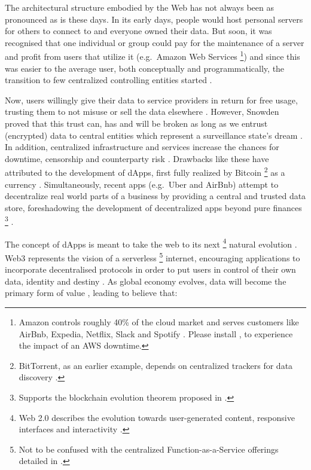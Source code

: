 The architectural structure embodied by the Web has not always been as pronounced as is these days. In its early days, people would host personal servers for others to connect to and everyone owned their data. But soon, it was recognised that one individual or group could pay for the maintenance of a server and profit from users that utilize it (e.g.~Amazon Web Services \footnote{Amazon controls roughly 40\% of the cloud market and serves customers like AirBnb, Expedia, Netflix, Slack and Spotify \cite{Verge2018}. Please install \cite{fuckOffAWS}, to experience the impact of an AWS downtime.}) and since this was easier to the average user, both conceptually and programmatically, the transition to few centralized controlling entities started \cite[pp.~14]{Raval.2016}. 

Now, users willingly give their data to service providers in return for free usage, trusting them to not misuse or sell the data elsewhere \cite[p.~24]{Raval.2016}. However, Snowden proved that this trust can, has and will be broken as long as we entrust (encrypted) data to central entities which represent a surveillance state's dream \cite{Guardian2013} \cite[p.~25]{Raval.2016}. In addition, centralized infrastructure and services increase the chances for downtime, censorship and \gls{counterparty risk} \cite[p.~23]{Antonopoulos.2018}. Drawbacks like these have attributed to the development of \acp{dApp}, first fully realized by Bitcoin \footnote{BitTorrent, as an earlier example, depends on centralized trackers for data discovery \cite[p.~26]{Raval.2016}.} as a currency \cite[p.~1]{Johnston2015} \cite[p.~1]{bitcoin}. Simultaneously, recent apps (e.g.~Uber and AirBnb) attempt to decentralize real world parts of a business by providing a central and trusted data store, foreshadowing the development of decentralized apps beyond pure finances \footnote{Supports the blockchain evolution theorem proposed in \cite{Swan.2015}.} \cite[p.~15]{Raval.2016}.

The concept of \acp{dApp} is meant to take the web to its next \footnote{Web 2.0 describes the evolution towards user-generated content, responsive interfaces and interactivity \cite[p.~34]{Antonopoulos.2018}.} natural evolution \cite[pp.~34]{Antonopoulos.2018}. Web3 represents the vision of a serverless \footnote{Not to be confused with the centralized Function-as-a-Service offerings detailed in \cite{serverlessComputing}.} internet, encouraging applications to incorporate decentralised protocols in order to put users in control of their own data, identity and destiny \cite{web3}. As global economy evolves, data will become the primary form of value \cite[p.~25]{Raval.2016}, leading \citeauthor{Raval.2016} to believe that:

